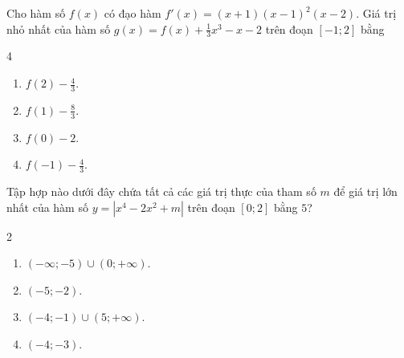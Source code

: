 \begin{baitap}
	Cho hàm số $f(x)$ có đạo hàm $f'(x) = (x + 1)(x - 1)^2(x - 2)$. Giá trị nhỏ nhất của hàm số $g(x) = f(x) + \frac{1}{3}x^3 - x - 2$ trên đoạn $[-1; 2]$ bằng
	\begin{multicols}{4}
		\begin{enumerate}[\quad \bf A.]
			\item $f(2) - \frac{4}{3}$.
			\item $f(1) - \frac{8}{3}$.
			\item $f(0) - 2$.
			\item $f(-1) - \frac{4}{3}$.
		\end{enumerate}
	\end{multicols}
\end{baitap}

\begin{baitap}
	Tập hợp nào dưới đây chứa tất cả các giá trị thực của tham số $m$ để giá trị lớn nhất của hàm số $y = \left|x^4 - 2x^2 + m\right|$ trên đoạn $[0; 2]$ bằng $5$?
	\begin{multicols}{2}
		\begin{enumerate}[\quad \bf A.]
			\item $(-\infty; -5) \cup (0; +\infty)$.
			\item $(-5; -2)$.
			\item $(-4; -1) \cup (5; +\infty)$.
			\item $(-4; -3)$.
		\end{enumerate}
	\end{multicols}
\end{baitap}

